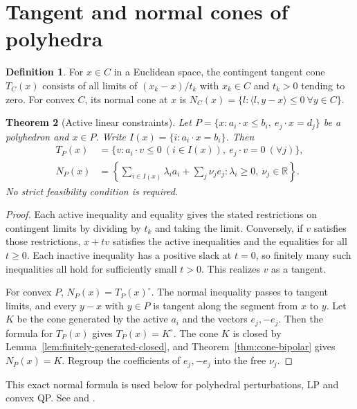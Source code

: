 \documentclass[11pt,oneside,openany]{book}
\theoremstyle{plain}
\newtheorem{theorem}{Theorem}[chapter]
\theoremstyle{definition}
\newtheorem{definition}[theorem]{Definition}
\theoremstyle{remark}
\begin{document}
\section{Tangent and normal cones of polyhedra}\label{v01-10}

\begin{definition}
For \(x\in C\) in a Euclidean space, the contingent tangent cone
\(T_C(x)\) consists of all limits of \((x_k-x)/t_k\)
with \(x_k\in C\) and \(t_k>0\) tending to zero.
For convex \(C\), its normal cone at \(x\) is
\(N_C(x)=\{l:\langle l,y-x\rangle\le0\ \forall y\in C\}\).
\end{definition}

\begin{theorem}[Active linear constraints]\label{thm:poly-normal}
Let \(P=\{x:a_i\cdot x\le b_i,\ e_j\cdot x=d_j\}\)
be a polyhedron and \(x\in P\). Write
\(I(x)=\{i:a_i\cdot x=b_i\}\).
Then
\[
\begin{split}
 T_P(x)&=\{v:a_i\cdot v\le0\ (i\in I(x)),\ e_j\cdot v=0\ (\forall j)\},\\
 N_P(x)&=\left\{\sum_{i\in I(x)}\lambda_i a_i+\sum_j\nu_j e_j:
                   \lambda_i\ge0,\ \nu_j\in\mathbb R\right\}.
\end{split}
\]
No strict feasibility condition is required.
\end{theorem}

\begin{proof}
Each active inequality and equality gives the stated restrictions
on contingent limits by dividing by \(t_k\) and taking the limit.
Conversely, if \(v\) satisfies those restrictions, \(x+tv\)
satisfies the active inequalities and the equalities for all
\(t\ge0\). Each inactive inequality has a positive slack at
\(t=0\), so finitely many such inequalities all hold for
sufficiently small \(t>0\). This realizes \(v\) as a tangent.

For convex \(P\), \(N_P(x)=T_P(x)^\circ\). The normal inequality
passes to tangent limits, and every \(y-x\) with \(y\in P\)
is tangent along the segment from \(x\) to \(y\).
Let \(K\) be the cone generated by the active \(a_i\) and
the vectors \(e_j,-e_j\). Then the formula for \(T_P(x)\)
gives \(T_P(x)=K^\circ\). The cone \(K\) is closed by
Lemma~\ref{lem:finitely-generated-closed}, and
Theorem~\ref{thm:cone-bipolar} gives \(N_P(x)=K\).
Regroup the coefficients of \(e_j,-e_j\) into the free \(\nu_j\).
\end{proof}

This exact normal formula is used below for polyhedral perturbations,
LP and convex QP. See \cite[\S22]{Rockafellar} and
\cite[\S\S12.3 and 13.2]{NocedalWright}.
\end{document}
